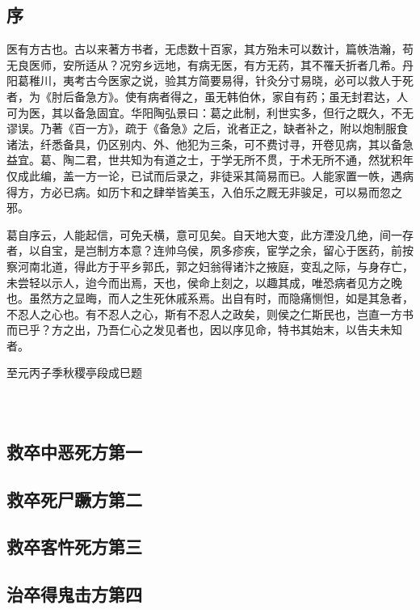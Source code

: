 \documentclass[12pt,UTF8]{ctexbook}
\begin{document}
\chapter{序}

医有方古也。古以来著方书者，无虑数十百家，其方殆未可以数计，篇帙浩瀚，苟无良医师，安所适从？况穷乡远地，有病无医，有方无药，其不罹夭折者几希。丹阳葛稚川，夷考古今医家之说，验其方简要易得，针灸分寸易晓，必可以救人于死者，为《肘后备急方》。使有病者得之，虽无韩伯休，家自有药；虽无封君达，人可为医，其以备急固宜。华阳陶弘景曰：葛之此制，利世实多，但行之既久，不无谬误。乃著《百一方》，疏于《备急》之后，讹者正之，缺者补之，附以炮制服食诸法，纤悉备具，仍区别内、外、他犯为三条，可不费讨寻，开卷见病，其以备急益宜。葛、陶二君，世共知为有道之士，于学无所不贯，于术无所不通，然犹积年仅成此编，盖一方一论，已试而后录之，非徒采其简易而已。人能家置一帙，遇病得方，方必已病。如历卞和之肆举皆美玉，入伯乐之厩无非骏足，可以易而忽之邪。

葛自序云，人能起信，可免夭横，意可见矣。自天地大变，此方湮没几绝，间一存者，以自宝，是岂制方本意？连帅乌侯，夙多疹疾，宦学之余，留心于医药，前按察河南北道，得此方于平乡郭氏，郭之妇翁得诸汴之掖庭，变乱之际，与身存亡，未尝轻以示人，迨今而出焉，天也，侯命上刻之，以趣其成，唯恐病者见方之晚也。虽然方之显晦，而人之生死休戚系焉。出自有时，而隐痛恻怛，如是其急者，不忍人之心也。有不忍人之心，斯有不忍人之政矣，则侯之仁斯民也，岂直一方书而已乎？方之出，乃吾仁心之发见者也，因以序见命，特书其始末，以告夫未知者。

至元丙子季秋稷亭段成巳题

\mainmatter

~\\

\part{}

\chapter{救卒中恶死方第一}
\chapter{救卒死尸蹶方第二}
\chapter{救卒客忤死方第三}
\chapter{治卒得鬼击方第四}
\end{document}
